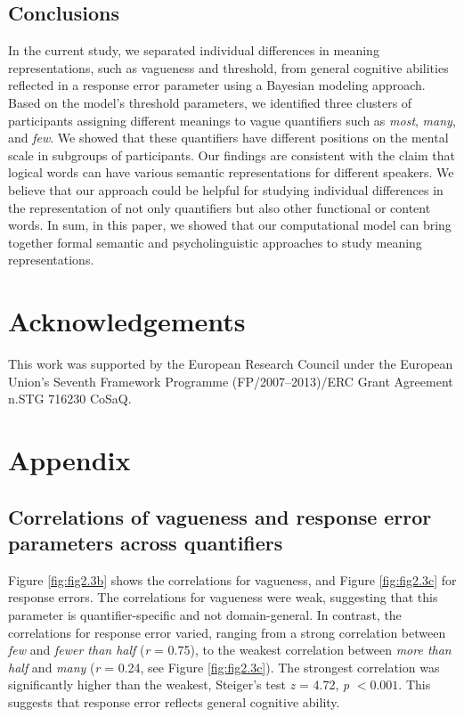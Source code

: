 \documentclass{article}
\begin{document}
\subsection{Conclusions}
In the current study, we separated individual differences in meaning representations, such as vagueness and threshold, from general cognitive abilities reflected in a response error parameter using a Bayesian modeling approach. Based on the model's threshold parameters, we identified three clusters of participants assigning different meanings to vague quantifiers such as \textit{most}, \textit{many}, and \textit{few}. We showed that these quantifiers have different positions on the mental scale in subgroups of participants. Our findings are consistent with the claim that logical words can have various semantic representations for different speakers. We believe that our approach could be helpful for studying individual differences in the representation of not only quantifiers but also other functional or content words. In sum, in this paper, we showed that our computational model can bring together formal semantic and psycholinguistic approaches to study meaning representations.

\section{Acknowledgements}
This work was supported by the European Research Council under the European Union's Seventh Framework Programme (FP/2007–2013)/ERC Grant Agreement n.STG 716230 CoSaQ. 




\appendix
\section{Appendix}\label{appendix:ch3}
\subsection{Correlations of vagueness and response error parameters across quantifiers}\label{appendix:ch3.1}
Figure \ref{fig:fig2.3b} shows the correlations for vagueness, and Figure \ref{fig:fig2.3c} for response errors. The correlations for vagueness were weak, suggesting that this parameter is quantifier-specific and not domain-general. In contrast, the correlations for response error varied, ranging from a strong correlation between \textit{few} and \textit{fewer than half} (\textit{r} = 0.75), to the weakest correlation between \textit{more than half} and \textit{many} (\textit{r} = 0.24, see Figure \ref{fig:fig2.3c}). The strongest correlation was significantly higher than the weakest, Steiger's test \textit{z} = 4.72, \textit{p} $< 0.001$. This suggests that response error reflects general cognitive ability.
\end{document}
